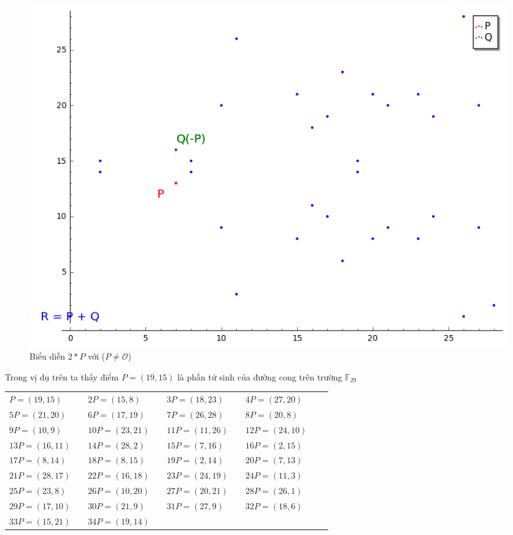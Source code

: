 \documentclass[a4paper,12pt]{report}
\begin{document}
\begin{center}
\begin{figure}[H]
\includegraphics[width=0.8\linewidth]{../im15.png}
\caption{Biểu diễn $2*P$ với ($P \neq \mathcal{O}$)}  \label{h19-1}
\end{figure}
\end{center}
Trong vị dụ trên ta thấy điểm $P = (19, 15)$ là phần tử sinh của đường cong trên trường $\mathbb{F}_{29}$
\begin{center}
\begin{tabular}{lllllllll}
$P = (19, 15)$ & & $2P = (15, 8)$ & & $3P = (18, 23)$ & & $4P = (27, 20)$ \\
$5P = (21, 20)$ & & $6P = (17, 19)$ & & $7P = (26, 28)$ & & $8P = (20, 8)$ \\
$9P = (10, 9)$ & & $10P = (23, 21)$ & & $11P = (11, 26)$ & & $12P = (24, 10)$ \\
$13P = (16, 11)$ & & $14P = (28, 2)$ & & $15P = (7, 16)$ & & $16P = (2, 15)$ \\
$17P = (8, 14)$ & & $18P = (8, 15)$ & & $19P = (2, 14)$ & & $20P = (7, 13)$ \\
$21P = (28, 17)$ & & $22P = (16, 18)$ & & $23P = (24, 19)$ & & $24P = (11, 3)$ \\
$25P = (23, 8)$ & & $26P = (10, 20)$ & & $27P = (20, 21)$ & & $28P = (26, 1)$ \\
$29P = (17, 10)$ & & $30P = (21, 9)$ & & $31P = (27, 9)$ & & $32P = (18, 6)$ \\
$33P = (15, 21)$ & & $34P = (19, 14)$  \\
\end{tabular}
\end{center}
\end{document}
